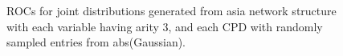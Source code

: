 \documentclass{article} %
\newlength{\subfigheight}
\begin{document}
\begin{figure}[h]
\centering
\caption{ROCs for joint distributions generated from asia network structure with each variable having arity 3, and each CPD with randomly sampled entries from abs(Gaussian).}
\end{figure}
\end{document}
